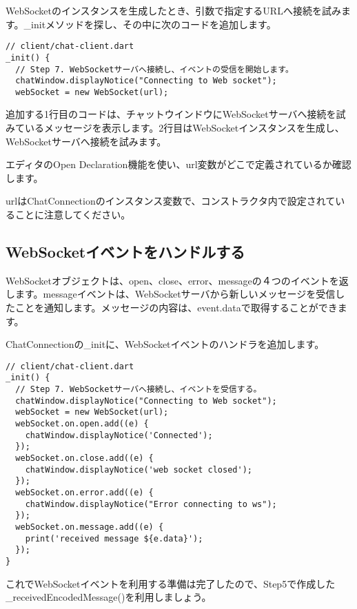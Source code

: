 WebSocketのインスタンスを生成したとき、引数で指定するURLへ接続を試みます。\_initメソッドを探し、その中に次のコードを追加します。

\begin{verbatim}
// client/chat-client.dart
_init() {
  // Step 7. WebSocketサーバへ接続し、イベントの受信を開始します。
  chatWindow.displayNotice("Connecting to Web socket");
  webSocket = new WebSocket(url);
\end{verbatim}

追加する1行目のコードは、チャットウインドウにWebSocketサーバへ接続を試みているメッセージを表示します。2行目はWebSocketインスタンスを生成し、WebSocketサーバへ接続を試みます。

エディタのOpen Declaration機能を使い、url変数がどこで定義されているか確認します。


urlはChatConnectionのインスタンス変数で、コンストラクタ内で設定されていることに注意してください。

\subsection{WebSocketイベントをハンドルする}

WebSocketオブジェクトは、open、close、error、messageの４つのイベントを返します。messageイベントは、WebSocketサーバから新しいメッセージを受信したことを通知します。メッセージの内容は、event.dataで取得することができます。


ChatConnectionの\_initに、WebSocketイベントのハンドラを追加します。

\begin{verbatim}
// client/chat-client.dart
_init() {
  // Step 7. WebSocketサーバへ接続し、イベントを受信する。
  chatWindow.displayNotice("Connecting to Web socket");
  webSocket = new WebSocket(url);
  webSocket.on.open.add((e) {
    chatWindow.displayNotice('Connected');
  });
  webSocket.on.close.add((e) {
    chatWindow.displayNotice('web socket closed');
  });
  webSocket.on.error.add((e) {
    chatWindow.displayNotice("Error connecting to ws");
  });
  webSocket.on.message.add((e) {
    print('received message ${e.data}');
  });
}
\end{verbatim}

これでWebSocketイベントを利用する準備は完了したので、Step5で作成した\_receivedEncodedMessage()を利用しましょう。

